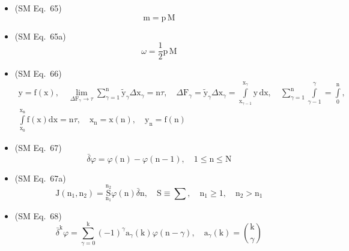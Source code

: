 \documentclass[12pt]{article}
\begin{document}
\begin{itemize}[label={},leftmargin=0pt]
    \item (SM Eq.\ 65) 
    \[
    \mathrm{m} = \mathrm{p}\,\mathrm{M}
    \]

    \item (SM Eq.\ 65a) 
    \[
    \omega = \frac{1}{2}\mathrm{p}\,\mathrm{M}
    \]

    \item (SM Eq.\ 66) 
    \[
    \begin{gathered}
    \mathrm{y} = \mathrm{f}(\mathrm{x}), \quad \lim_{\Delta \mathrm{F}_\gamma \to \tau} \sum_{\gamma=1}^{\mathrm{n}} \tilde{\mathrm{y}}_\gamma \Delta \mathrm{x}_\gamma = \mathrm{n}\tau, \quad \Delta \mathrm{F}_\gamma = \tilde{\mathrm{y}}_\gamma \Delta \mathrm{x}_\gamma = \int\limits_{\mathrm{x}_{\gamma-1}}^{\mathrm{x}_\gamma} \mathrm{y}\,\mathrm{dx}, \quad \sum_{\gamma=1}^{\mathrm{n}} \int\limits_{\gamma-1}^{\gamma} = \int\limits_0^{\mathrm{n}}, \\
    \int\limits_{\mathrm{x}_0}^{\mathrm{x}_{\mathrm{n}}} \mathrm{f}(\mathrm{x})\mathrm{dx} = \mathrm{n}\tau, \quad \mathrm{x}_{\mathrm{n}} = \mathrm{x}(\mathrm{n}), \quad \mathrm{y}_{\mathrm{n}} = \mathrm{f}(\mathrm{n})
    \end{gathered}
    \]

    \item (SM Eq.\ 67) 
    \[
    \bar{\delta}\varphi = \varphi(\mathrm{n}) - \varphi(\mathrm{n}-1), \quad 1 \le \mathrm{n} \le \mathrm{N}
    \]

    \item (SM Eq.\ 67a) 
    \[
    \mathrm{J}(\mathrm{n}_1, \mathrm{n}_2) = \underset{\mathrm{n}_1}{\overset{\mathrm{n}_2}{\mathrm{S}}} \varphi(\mathrm{n})\bar{\delta}\mathrm{n}, \quad \mathrm{S} \equiv \sum, \quad \mathrm{n}_1 \ge 1, \quad \mathrm{n}_2 > \mathrm{n}_1
    \]

    \item (SM Eq.\ 68) 
    \[
    \bar{\delta}^\mathrm{k} \varphi = \sum_{\gamma=0}^\mathrm{k} (-1)^\gamma \mathrm{a}_\gamma(\mathrm{k}) \varphi(\mathrm{n}-\gamma), \quad \mathrm{a}_\gamma(\mathrm{k}) = \binom{\mathrm{k}}{\gamma}
    \]


\end{itemize}
\end{document}
